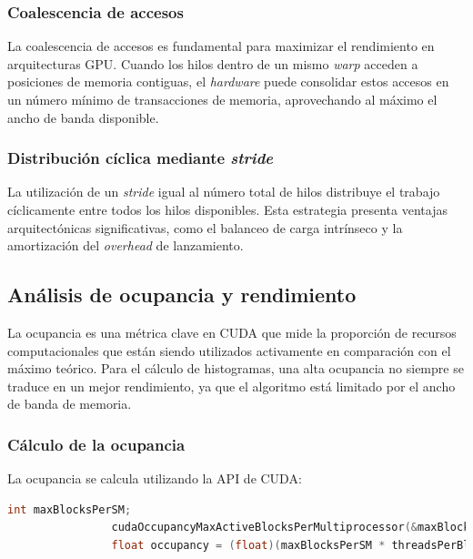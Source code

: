         \subsubsection{Coalescencia de accesos}

            La coalescencia de accesos es fundamental para maximizar el rendimiento en arquitecturas GPU. Cuando los hilos dentro de un mismo \textit{warp} acceden a posiciones de memoria contiguas, el \textit{hardware} puede consolidar estos accesos en un número mínimo de transacciones de memoria, aprovechando al máximo el ancho de banda disponible.

        \subsubsection{Distribución cíclica mediante \textit{stride}}

            La utilización de un \textit{stride} igual al número total de hilos distribuye el trabajo cíclicamente entre todos los hilos disponibles. Esta estrategia presenta ventajas arquitectónicas significativas, como el balanceo de carga intrínseco y la amortización del \textit{overhead} de lanzamiento.

    \subsection{Análisis de ocupancia y rendimiento}

        La ocupancia es una métrica clave en CUDA que mide la proporción de recursos computacionales que están siendo utilizados activamente en comparación con el máximo teórico. Para el cálculo de histogramas, una alta ocupancia no siempre se traduce en un mejor rendimiento, ya que el algoritmo está limitado por el ancho de banda de memoria.
        
        \subsubsection{Cálculo de la ocupancia}

            La ocupancia se calcula utilizando la API de CUDA:
            
            \begin{lstlisting}[language=C, caption={Calculo de ocupancia teorica.}, gobble=16]
                int maxBlocksPerSM;
                cudaOccupancyMaxActiveBlocksPerMultiprocessor(&maxBlocksPerSM, histogram, threadsPerBlock, 0);
                float occupancy = (float)(maxBlocksPerSM * threadsPerBlock) / prop.maxThreadsPerMultiProcessor;
            \end{lstlisting}
            
